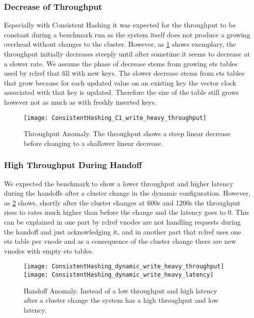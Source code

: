 \subsubsection{Decrease of Throughput}
Especially with Consistent Hashing it was expected for the throughput to be constant during a benchmark run as the system itself does not produce a growing overhead without changes to the cluster.
However, as \cref{fig:throughput_anomaly} shows exemplary, the throughput initially decreases steeply until after sometime it seems to decrease at a slower rate.
We assume the phase of decrease stems from growing ets tables used by rclref that fill with new keys.
The slower decrease stems from ets tables that grow because for each updated value on an existing key the vector clock associated with that key is updated.
Therefore the size of the table still grows however not as much as with freshly inserted keys.
\begin{figure}
\center
\texttt{[image: ConsistentHashing\_C1\_write\_heavy\_throughput]}
\caption[Throughput Anomaly]{Throughput Anomaly. The throughput shows a steep linear decrease before changing to a shallower linear decrease.}
\label{fig:throughput_anomaly}
\end{figure}

\subsubsection{High Throughput During Handoff}
We expected the benchmark to show a lower throughput and higher latency during the handoffs after a cluster change in the dynamic configuration.
However, as \cref{fig:handoff_anomaly} shows, shortly after the cluster changes at 600s and 1200s the throughput rises to rates much higher than before the change and the latency goes to 0.
This can be explained in one part by rclref vnodes are not handling requests during the handoff and just acknowledging it, and in another part that rclref uses one ets table per vnode and as a consequence of the cluster change there are new vnodes with empty ets tables.
\begin{figure}
\texttt{[image: ConsistentHashing\_dynamic\_write\_heavy\_throughput]}
\texttt{[image: ConsistentHashing\_dynamic\_write\_heavy\_latency]}
\caption[Handoff Anomaly]{Handoff Anomaly. Instead of a low throughput and high latency after a cluster change the system has a high throughput and low latency.}
\label{fig:handoff_anomaly}
\end{figure}

